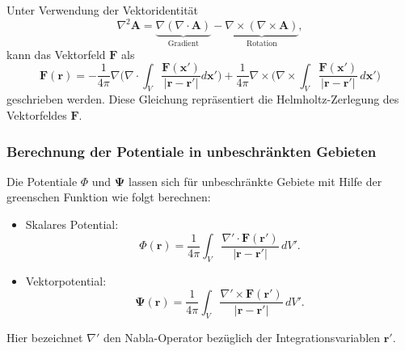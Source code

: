
Unter Verwendung der Vektoridentität
\begin{equation}
\nabla^2 \boldsymbol{A}
=
\underbrace{
\nabla ( \nabla \cdot \boldsymbol{A} )
}_{
\textstyle\text{Gradient}
}
-
\underbrace{
\nabla \times (\nabla \times \boldsymbol{A} )
}_{
\textstyle\text{Rotation}
},
\end{equation}
kann das Vektorfeld $\boldsymbol{F}$ als
\begin{equation}
\boldsymbol{F}(\boldsymbol{r})
=
- \frac{1}{4 \pi} \nabla \biggl(
\nabla \cdot \int_V
\frac{\boldsymbol{F}(\boldsymbol{x}')
}{
|\boldsymbol{r}
-
\boldsymbol{r}'|} d\boldsymbol{x}'
\biggr)
+
\frac{1}{4 \pi} \nabla \times \biggl(
\nabla \times
\int_V
\frac{\boldsymbol{F}(\boldsymbol{x}')
}{
|\boldsymbol{r} - \boldsymbol{r}'|
}
\,d\boldsymbol{x}'
\biggr)
\end{equation}
geschrieben werden.
Diese Gleichung repräsentiert die Helmholtz-Zerlegung des Vektorfeldes $\boldsymbol{F}$.

\subsubsection{Berechnung der Potentiale in unbeschränkten Gebieten}

Die Potentiale $\Phi$ und $\boldsymbol{\Psi}$ lassen sich für unbeschränkte Gebiete mit Hilfe der greenschen Funktion wie folgt berechnen:

\begin{itemize}
\item Skalares Potential:
\begin{equation}
\Phi(\boldsymbol{r})
=
\frac{1}{4 \pi}
\int_{V}
\frac{\nabla' \cdot \boldsymbol{F}(\boldsymbol{r}')}{|\boldsymbol{r} - \boldsymbol{r}'|}
\,dV'.
\end{equation}

\item Vektorpotential:
\begin{equation}
\boldsymbol{\Psi}(\boldsymbol{r})
=
\frac{1}{4 \pi}
\int_{V}
\frac{\nabla' \times \boldsymbol{F}(\boldsymbol{r}')}{|\boldsymbol{r} - \boldsymbol{r}'|}
\,dV'.
\end{equation}
\end{itemize}
Hier bezeichnet $\nabla'$ den Nabla-Operator bezüglich der
Integrationsvariablen $\boldsymbol{r}'$.

